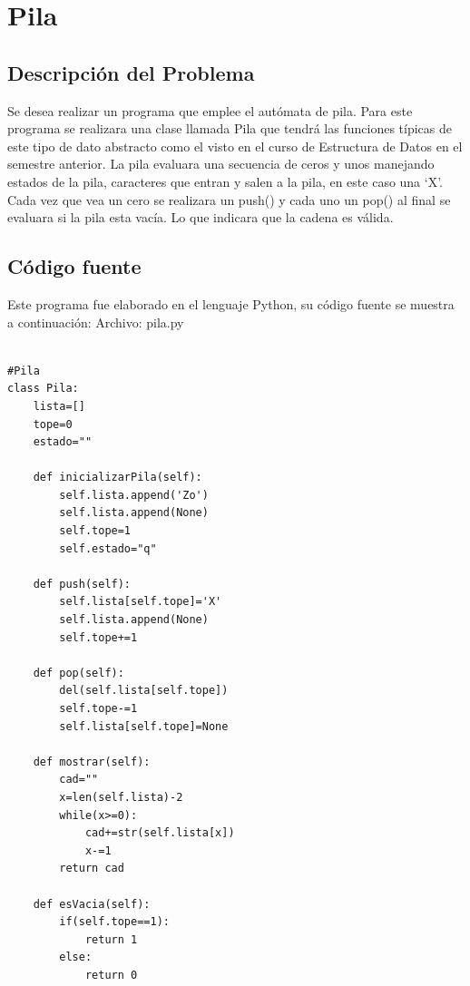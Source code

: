 \documentclass[12pt]{article}
\begin{document}
\newpage
\section{Pila}
\subsection{Descripción del Problema}

Se desea realizar un programa que emplee el autómata de pila. Para este programa se realizara una clase llamada Pila que tendrá las funciones típicas de este tipo de dato abstracto como el visto en el curso de Estructura de Datos en el semestre anterior. La pila evaluara una secuencia de ceros y unos manejando estados de la pila, caracteres que entran y salen a la pila, en este caso una ‘X’. Cada vez que vea un cero se realizara un push() y cada uno un pop() al final se evaluara si la pila esta vacía. Lo que indicara que la cadena es válida.

\subsection{Código fuente}
Este programa fue elaborado en el lenguaje Python, su código fuente se muestra a continuación:
Archivo: pila.py
\lstset{language=Python, breaklines=true, basicstyle=\footnotesize}
\begin{lstlisting}[frame=single]

#Pila
class Pila:
	lista=[]
	tope=0
	estado=""

	def inicializarPila(self):
		self.lista.append('Zo')
		self.lista.append(None)
		self.tope=1
		self.estado="q"

	def push(self):
		self.lista[self.tope]='X'
		self.lista.append(None)
		self.tope+=1

	def pop(self):
		del(self.lista[self.tope])
		self.tope-=1
		self.lista[self.tope]=None

	def mostrar(self):
		cad=""
		x=len(self.lista)-2
		while(x>=0):
			cad+=str(self.lista[x])
			x-=1
		return cad

	def esVacia(self):
		if(self.tope==1):
			return 1
		else:
			return 0

\end{lstlisting}
\end{document}
